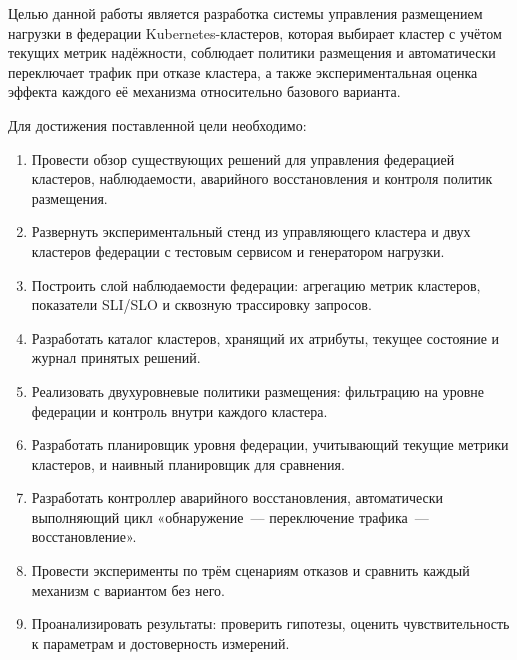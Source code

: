 
Целью данной работы является разработка системы управления размещением
нагрузки в федерации Kubernetes-кластеров, которая выбирает кластер с учётом
текущих метрик надёжности, соблюдает политики размещения и автоматически
переключает трафик при отказе кластера, а также экспериментальная оценка
эффекта каждого её механизма относительно базового варианта.

Для достижения поставленной цели необходимо:
\begin{enumerate}
  \item Провести обзор существующих решений для управления федерацией
        кластеров, наблюдаемости, аварийного восстановления и контроля
        политик размещения.
  \item Развернуть экспериментальный стенд из управляющего кластера и двух
        кластеров федерации с тестовым сервисом и генератором нагрузки.
  \item Построить слой наблюдаемости федерации: агрегацию метрик кластеров,
        показатели SLI/SLO и сквозную трассировку запросов.
  \item Разработать каталог кластеров, хранящий их атрибуты, текущее
        состояние и журнал принятых решений.
  \item Реализовать двухуровневые политики размещения: фильтрацию на уровне
        федерации и контроль внутри каждого кластера.
  \item Разработать планировщик уровня федерации, учитывающий текущие
        метрики кластеров, и наивный планировщик для сравнения.
  \item Разработать контроллер аварийного восстановления, автоматически
        выполняющий цикл «обнаружение~--- переключение трафика~---
        восстановление».
  \item Провести эксперименты по трём сценариям отказов и сравнить каждый
        механизм с вариантом без него.
  \item Проанализировать результаты: проверить гипотезы, оценить
        чувствительность к параметрам и достоверность измерений.
\end{enumerate}
